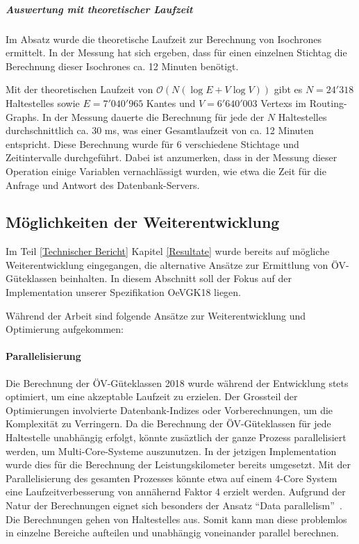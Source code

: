 \subparagraph{Auswertung mit theoretischer Laufzeit}
Im Absatz  wurde die theoretische Laufzeit zur Berechnung von \glspl{Isochrone} ermittelt.
In der Messung hat sich ergeben, dass für einen einzelnen Stichtag die Berechnung dieser \glspl{Isochrone} ca. 12 Minuten benötigt.

Mit der theoretischen Laufzeit von $\mathcal{O}(N (\log E + V \log V))$ gibt es $N = 24'318$ \glspl{Haltestelle} sowie $E = 7'040'965$ \glspl{Kante} und $V = 6'640'003$ \glspl{Vertex} im \glspl{Routing-Graph}.
In der Messung dauerte die Berechnung für jede der $N$ \glspl{Haltestelle} durchschnittlich ca. 30 ms, was einer Gesamtlaufzeit von ca. 12 Minuten entspricht.
Diese Berechnung wurde für 6 verschiedene Stichtage und Zeitintervalle durchgeführt.
Dabei ist anzumerken, dass in der Messung dieser Operation einige Variablen vernachlässigt wurden, wie etwa die Zeit für die Anfrage und Antwort des Datenbank-Servers.

\subsection{Möglichkeiten der Weiterentwicklung}
\label{Resultate und Weiterentwicklung:Möglichkeiten der Weiterentwicklung}

Im Teil \ref{Technischer Bericht} Kapitel \ref{Resultate} wurde bereits auf mögliche Weiterentwicklung eingegangen, die alternative Ansätze zur Ermittlung von \gls{ÖV-Güteklassen} beinhalten.
In diesem Abschnitt soll der Fokus auf der Implementation unserer Spezifikation \gls{OeVGK18} liegen.

Während der Arbeit sind folgende Ansätze zur Weiterentwicklung und Optimierung aufgekommen:

\paragraph{Parallelisierung}
Die Berechnung der \gls{ÖV-Güteklassen} 2018 wurde während der Entwicklung stets optimiert, um eine akzeptable Laufzeit zu erzielen.
Der Grossteil der Optimierungen involvierte Datenbank-Indizes oder Vorberechnungen, um die Komplexität zu Verringern.
Da die Berechnung der \gls{ÖV-Güteklassen} für jede \gls{Haltestelle} unabhängig erfolgt, könnte zusäztlich der ganze Prozess parallelisiert werden, um Multi-Core-Systeme auszunutzen.
In der jetzigen Implementation wurde dies für die Berechnung der \gls{Leistungskilometer} bereits umgesetzt.
Mit der Parallelisierung des gesamten Prozesses könnte etwa auf einem 4-Core System eine Laufzeitverbesserung von annähernd Faktor 4 erzielt werden.
Aufgrund der Natur der Berechnungen eignet sich besonders der Ansatz "`Data parallelism"'~\cite{parallel_comp}.
Die Berechnungen gehen von \glspl{Haltestelle} aus.
Somit kann man diese problemlos in einzelne Bereiche aufteilen und unabhängig voneinander parallel berechnen.

